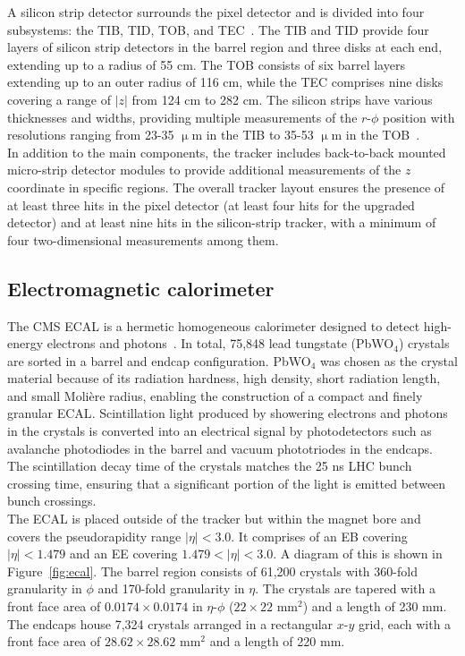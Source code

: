 A silicon strip detector surrounds the pixel detector and is divided into four subsystems: the \ac{TIB}, \ac{TID}, \ac{TOB}, and \ac{TEC}~\cite{CMS_Setup}. 
The \ac{TIB} and \ac{TID} provide four layers of silicon strip detectors in the barrel region and three disks at each end, extending up to a radius of 55 cm. 
The \ac{TOB} consists of six barrel layers extending up to an outer radius of 116 cm, while the \ac{TEC} comprises nine disks covering a range of $|z|$ from 124 cm to 282 cm. 
The silicon strips have various thicknesses and widths, providing multiple measurements of the $r$-$\phi$ position with resolutions ranging from 23-35 $\upmu$m in the \ac{TIB} to 35-53 $\upmu$m in the \ac{TOB}~\cite{CMS_Setup}. \\

In addition to the main components, the tracker includes back-to-back mounted micro-strip detector modules to provide additional measurements of the $z$ coordinate in specific regions. 
The overall tracker layout ensures the presence of at least three hits in the pixel detector (at least four hits for the upgraded detector) and at least nine hits in the silicon-strip tracker, with a minimum of four two-dimensional measurements among them.

\subsection{Electromagnetic calorimeter}

The \ac{CMS} \ac{ECAL} is a hermetic homogeneous calorimeter designed to detect high-energy electrons and photons~\cite{CMS_Setup,CMS:2013lxn}. 
In total, 75,848 lead tungstate (PbWO$_4$) crystals are sorted in a barrel and endcap configuration. 
PbWO$_4$ was chosen as the crystal material because of its radiation hardness, high density, short radiation length, and small Molière radius, enabling the construction of a compact and finely granular \ac{ECAL}. 
Scintillation light produced by showering electrons and photons in the crystals is converted into an electrical signal by photodetectors such as avalanche photodiodes in the barrel and vacuum phototriodes in the endcaps. 
The scintillation decay time of the crystals matches the 25 ns \ac{LHC} bunch crossing time, ensuring that a significant portion of the light is emitted between bunch crossings. \\

The \ac{ECAL} is placed outside of the tracker but within the magnet bore and covers the pseudorapidity range $|\eta| < 3.0$. 
It comprises of an \ac{EB} covering $|\eta| < 1.479$ and an \ac{EE} covering $1.479 < |\eta| < 3.0$. 
A diagram of this is shown in Figure~\ref{fig:ecal}.
The barrel region consists of 61,200 crystals with 360-fold granularity in $\phi$ and 170-fold granularity in $\eta$. 
The crystals are tapered with a front face area of $0.0174 \times 0.0174$ in $\eta$-$\phi$ ($22 \times 22$ mm$^2$) and a length of 230 mm. 
The endcaps house 7,324 crystals arranged in a rectangular $x$-$y$ grid, each with a front face area of $28.62 \times 28.62$ mm$^2$ and a length of 220 mm. \\

